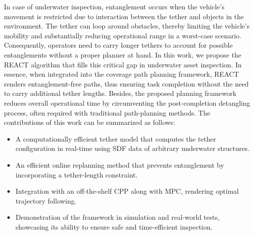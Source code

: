 %
%
In case of underwater inspection, entanglement occurs when the vehicle's movement is restricted due to interaction between the tether and objects in the environment. The tether can loop around obstacles, thereby limiting the vehicle's mobility and substantially reducing operational range in a worst-case scenario. Consequently, operators need to carry longer tethers to account for possible entanglements without a proper planner at hand.
In this work, we propose the \ac{REACT} algorithm that fills this critical gap in underwater asset inspection. In essence, when integrated into the coverage path planning framework, \ac{REACT} renders entanglement-free paths, thus ensuring task completion without the need to carry additional tether lengths. Besides, the proposed planning framework reduces overall operational time by circumventing the post-completion detangling process, often required with traditional path-planning methods. The contributions of this work can be summarized as follows:
\begin{itemize}
\item A computationally efficient tether model that computes the tether configuration in real-time using \ac{SDF} data of arbitrary underwater structures.
\item An efficient online replanning method that prevents entanglement by incorporating a tether-length constraint.

\item Integration with an off-the-shelf \ac{CPP} along with \ac{MPC}, rendering optimal trajectory following.
\item Demonstration of the framework in simulation and real-world tests, showcasing its ability to ensure safe and time-efficient inspection.
\end{itemize}


